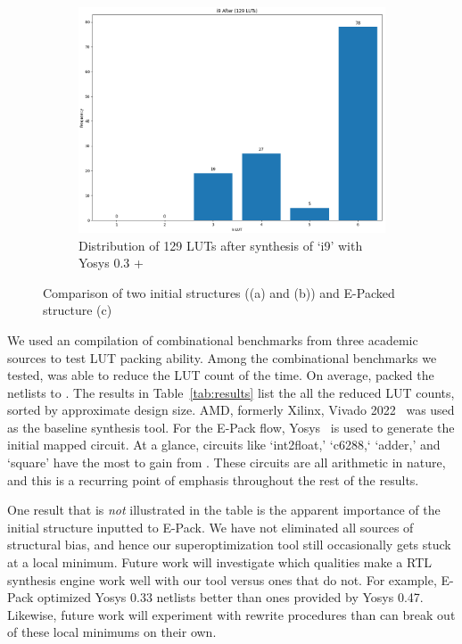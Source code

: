 \begin{figure}
    \hfill\vspace{4mm}
    \begin{subfigure}{0.47\textwidth}
        \centering
        \includegraphics[width=\textwidth]{img/epack.png}
        \caption{Distribution of 129 LUTs after synthesis of `i9' with Yosys 0.3 + \shortname{}}\label{fig:histogram:epack}
        \Description[]{}
    \end{subfigure}
    \caption{Comparison of two initial structures ((a) and (b)) and E-Packed structure (c) }\label{fig:histogram}
    \Description[]{}
\end{figure}

We used an compilation of \nbenchmarks{} combinational benchmarks from three
academic sources to test LUT packing ability. Among the combinational
benchmarks we tested, \shortname{} was able to reduce the LUT count \fmetric{}
of the time. On average, \shortname{} packed the netlists to \metric{}. The
results in Table~\ref{tab:results} list the all the reduced LUT counts, sorted
by approximate design size. AMD, formerly Xilinx, Vivado 2022~\cite{vivado} was
used as the baseline synthesis tool. For the E-Pack flow, Yosys~\cite{yosys} is
used to generate the initial mapped circuit. At a glance, circuits like
`int2float,' `c6288,` `adder,' and `square' have the most to gain from
\shortname{}. These circuits are all arithmetic in nature, and this is a
recurring point of emphasis throughout the rest of the results.

One result that is \textit{not} illustrated in the table is the apparent
importance of the initial structure inputted to E-Pack. We have not eliminated
all sources of structural bias, and hence our superoptimization tool still
occasionally gets stuck at a local minimum. Future work will investigate which
qualities make a RTL synthesis engine work well with our tool versus ones that
do not. For example, E-Pack optimized Yosys 0.33 netlists better than ones
provided by Yosys 0.47. Likewise, future work will experiment with rewrite
procedures than can break out of these local minimums on their own.

